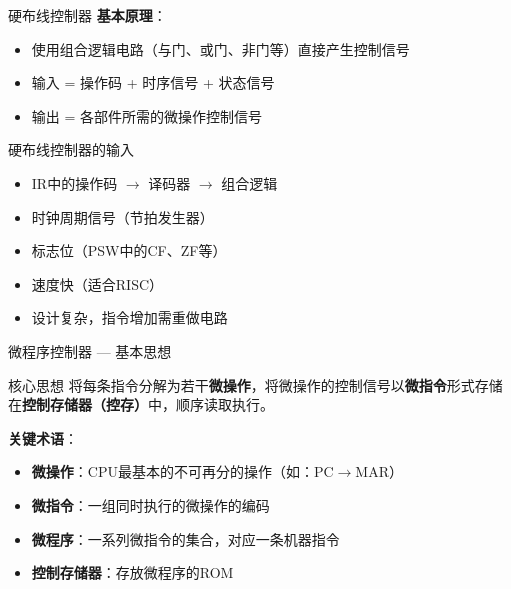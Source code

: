 \documentclass[10pt, aspectratio=169]{beamer}
\begin{document}
\begin{frame}{硬布线控制器}
    \textbf{基本原理}：
    \begin{itemize}
        \item 使用组合逻辑电路（与门、或门、非门等）直接产生控制信号
        \item 输入 = 操作码 + 时序信号 + 状态信号
        \item 输出 = 各部件所需的微操作控制信号
    \end{itemize}
    \vspace{0.3em}
    \begin{block}{硬布线控制器的输入}
        \begin{itemize}
            \item IR中的操作码 $\rightarrow$ 译码器 $\rightarrow$ 组合逻辑
            \item 时钟周期信号（节拍发生器）
            \item 标志位（PSW中的CF、ZF等）
        \end{itemize}
    \end{block}
    \vspace{0.3em}
    \begin{itemize}
        \item[+] 速度快（适合RISC）
        \item[-] 设计复杂，指令增加需重做电路
    \end{itemize}
\end{frame}

\begin{frame}{微程序控制器 --- 基本思想}
    \begin{block}{核心思想}
        将每条指令分解为若干\textbf{微操作}，将微操作的控制信号以\textbf{微指令}形式存储在\textbf{控制存储器（控存）}中，顺序读取执行。
    \end{block}
    \vspace{0.3em}
    \textbf{关键术语}：
    \begin{itemize}
        \item \textbf{微操作}：CPU最基本的不可再分的操作（如：PC$\rightarrow$MAR）
        \item \textbf{微指令}：一组同时执行的微操作的编码
        \item \textbf{微程序}：一系列微指令的集合，对应一条机器指令
        \item \textbf{控制存储器}：存放微程序的ROM
    \end{itemize}
\end{frame}
\end{document}
